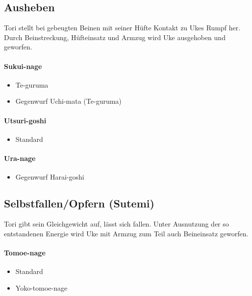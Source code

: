\documentclass[justified, a4paper, notitlepage, captions=tableheading, nobib]{tufte-handout}
\begin{document}
\subsection{Ausheben }
\label{sec:org71ad940}
Tori stellt bei gebeugten Beinen mit seiner Hüfte Kontakt zu Ukes Rumpf her. Durch Beinstreckung, Hüfteinsatz und Armzug wird Uke ausgehoben und geworfen.

\paragraph{Sukui-nage }
\label{sec:orgb2d7e0a}
\begin{itemize}
\item Te-guruma
\item Gegenwurf Uchi-mata (Te-guruma)
\end{itemize}

\paragraph{Utsuri-goshi }
\label{sec:org10b50d5}
\begin{itemize}
\item Standard
\end{itemize}

\paragraph{Ura-nage }
\label{sec:orgad03cef}
\begin{itemize}
\item Gegenwurf Harai-goshi
\end{itemize}

\subsection{Selbstfallen/Opfern (Sutemi) }
\label{sec:orgdfab464}
Tori gibt sein Gleichgewicht auf, lässt sich fallen. Unter Ausnutzung der so entstandenen Energie wird Uke mit Armzug zum Teil auch Beineinsatz geworfen.

\paragraph{Tomoe-nage }
\label{sec:org1276541}
\begin{itemize}
\item Standard
\item Yoko-tomoe-nage
\end{itemize}
\end{document}

